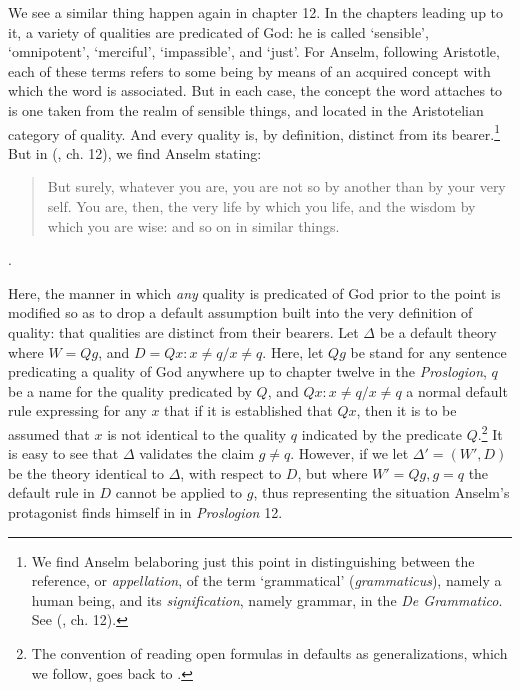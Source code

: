 \documentclass[]{birkjour}
\begin{document}
We see a similar thing happen again in chapter 12. In the chapters leading up to it, a variety of qualities are predicated of God: he is called `sensible', `omnipotent', `merciful', `impassible', and `just'. For Anselm, following Aristotle, each of these terms refers to some being by means of an acquired concept with which the word is associated. But in each case, the concept the word attaches to is one taken from the realm of sensible things, and located in the Aristotelian category of quality. And every quality is, by definition, distinct from its bearer.\footnote{We find Anselm belaboring just this point in distinguishing between the reference, or \textit{appellation}, of the term `grammatical' (\textit{grammaticus}), namely a human being, and its \textit{signification}, namely grammar, in the \textit{De Grammatico}. See (\cite{Anselm1974}, ch. 12).} But in (\cite{AnselmPros}, ch. 12), we find Anselm stating:
\begin{quote}
But surely, whatever you are, you are not so by another than by your very self. You are, then, the very life by which you life, and the wisdom by which you are wise: and so on in similar things.
\end{quote}.

Here, the manner in which \textit{any} quality is predicated of God prior to the point is modified so as to drop a default assumption built into the very definition of quality: that qualities are distinct from their bearers. Let $\Delta$ be a default theory where $W = {Qg}$, and $D = {Qx: x \ne q/ x \ne q}$. Here, let $Qg$ be stand for any sentence predicating a quality of God anywhere up to chapter twelve in the \textit{Proslogion}, $q$ be a name for the quality predicated by $Q$, and $Qx: x \ne q/ x \ne q$ a normal default rule expressing for any $x$ that if it is established that $Qx$, then it is to be assumed that $x$ is not identical to the quality $q$ indicated by the predicate $Q$.\footnote{The convention of reading open formulas in defaults as generalizations, which we follow, goes back to \cite{Reiter1980}.} It is easy to see that $\Delta$ validates the claim $g \ne q$. However, if we let $\Delta' = (W', D)$ be the theory identical to $\Delta$, with respect to $D$, but where $W' = {Qg, g = q}$ the default rule in $D$ cannot be applied to $g$, thus representing the situation Anselm's protagonist finds himself in in \textit{Proslogion} 12.
\end{document}
